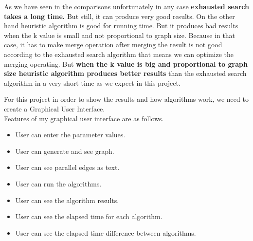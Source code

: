 \documentclass{beamer}
\begin{document}
\begin{projecttimeline5}

As we have seen in the comparisons unfortunately in any case \textbf{exhausted search takes a long time.} But still, it can produce very good results. On the other hand heuristic algorithm is good for running time. But it produces bad results when the k value is small and not proportional to graph size. Because in that case, it has to make merge operation after merging the result is not good according to the exhausted search algorithm that means we can optimize the merging operating. But \textbf{when the k value is big and proportional to graph size heuristic algorithm produces better results} than the exhausted search algorithm in a very short time as we expect in this project.
 
\end{projecttimeline5}

\begin{projecttimeline6}

For this project in order to show the results and how algorithms work, we need to create a Graphical User Interface. \\
\vspace{0.02\textheight}
Features of my graphical user interface are as follows.
\vspace{0.03\textheight}
\begin{itemize}
 \item User can enter the parameter values.
 \item User can generate and see graph.
 \item User can see parallel edges as text.
 \item User can run the algorithms.
 \item User can see the algorithm results.
 \item User can see the elapsed time for each algorithm.
 \item User can see the elapsed time difference between algorithms.
 
\end{itemize}
 
\end{projecttimeline6}

\begin{projecttimeline6}

\noindent{}

 
\end{projecttimeline6}
\end{document}
